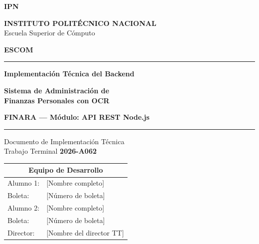 
\begin{titlepage}
  \centering

  \begin{minipage}[c]{0.15\textwidth}
    \centering
    \textbf{IPN}
  \end{minipage}
  \hfill
  \begin{minipage}[c]{0.65\textwidth}
    \centering
    {\large\textbf{INSTITUTO POLITÉCNICO NACIONAL}}\\[4pt]
    {\normalsize Escuela Superior de Cómputo}
  \end{minipage}
  \hfill
  \begin{minipage}[c]{0.15\textwidth}
    \centering
    \textbf{ESCOM}
  \end{minipage}

  \vspace{0.5cm}
  \noindent\rule{\textwidth}{1.2pt}

  \vspace{1.5cm}

  {\LARGE\bfseries\color{ipnrojo}
    Implementación Técnica del Backend\\[8pt]
  }

  \vspace{0.5cm}

  {\Large\bfseries
    Sistema de Administración de\\
    Finanzas Personales con OCR
  }

  \vspace{0.3cm}

  {\large\bfseries\color{ipngris}
    FINARA --- Módulo: API REST Node.js
  }

  \vspace{1.5cm}
  \noindent\rule{\textwidth}{0.4pt}
  \vspace{0.5cm}

  {\large
    Documento de Implementación Técnica\\
    Trabajo Terminal \textbf{2026-A062}
  }

  \vspace{1cm}

  \begin{tabular}{ll}
    \toprule
    \multicolumn{2}{c}{\textbf{Equipo de Desarrollo}} \\
    \midrule
    Alumno 1: & [Nombre completo] \\
    Boleta:   & [Número de boleta] \\
    \addlinespace
    Alumno 2: & [Nombre completo] \\
    Boleta:   & [Número de boleta] \\
    \addlinespace
    Director: & [Nombre del director TT] \\
    \bottomrule
  \end{tabular}


\end{titlepage}
